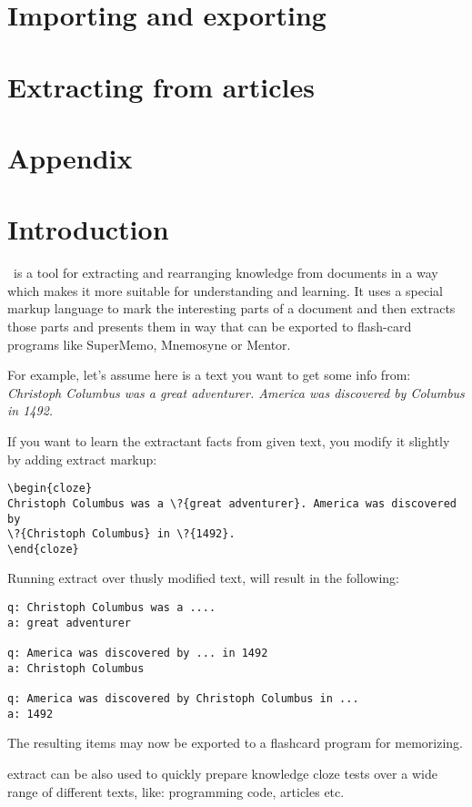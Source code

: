 \documentclass[a4paper,11pt]{article}
\newcommand{\probe}{\emph{\sc{probe{}}}}
\begin{document}
\section{Importing and exporting}

\section{Extracting from articles}


\section{Appendix}
\section{Introduction}

\probe\ is a tool for extracting and rearranging knowledge from documents in
a way which makes it more suitable for understanding and learning. It uses a
special markup language to mark the interesting parts of a document
and then extracts those parts and presents them in way that can be exported
to flash-card programs like SuperMemo, Mnemosyne or Mentor.

For example, let's assume here is a text you want to get some info from:
\textit{Christoph Columbus was a great adventurer. America was discovered by
Columbus in 1492.}

If you want to learn the extractant facts from given text, you modify it
slightly by adding extract markup:
\begin{verbatim}
\begin{cloze}
Christoph Columbus was a \?{great adventurer}. America was discovered by
\?{Christoph Columbus} in \?{1492}.
\end{cloze}
\end{verbatim}

Running extract over thusly modified text, will result in the following:
\begin{verbatim}
q: Christoph Columbus was a ....
a: great adventurer

q: America was discovered by ... in 1492
a: Christoph Columbus

q: America was discovered by Christoph Columbus in ...
a: 1492
\end{verbatim}

The resulting items may now be exported to a flashcard program for memorizing.

extract can be also used to quickly prepare knowledge cloze tests over a wide
range of different texts, like: programming code, articles etc.
\end{document}
